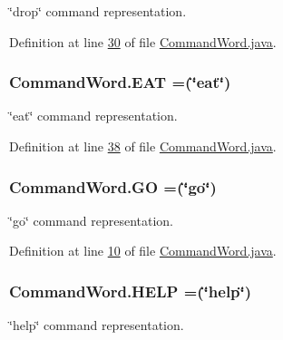 \char`\"{}drop\char`\"{} command representation. 



Definition at line \hyperlink{CommandWord_8java_source_l00030}{30} of file \hyperlink{CommandWord_8java_source}{Command\-Word.\-java}.

\hypertarget{enumCommandWord_a8a3ddfcc3d3f62697323325970089d95}{
\subsubsection[{E\-A\-T}]{\setlength{\rightskip}{0pt plus 5cm}Command\-Word.\-E\-A\-T =(\char`\"{}eat\char`\"{})}}\label{enumCommandWord_a8a3ddfcc3d3f62697323325970089d95}


\char`\"{}eat\char`\"{} command representation. 



Definition at line \hyperlink{CommandWord_8java_source_l00038}{38} of file \hyperlink{CommandWord_8java_source}{Command\-Word.\-java}.

\hypertarget{enumCommandWord_ab85d8b5fa5f3890548bff9a1ccfba218}{
\subsubsection[{G\-O}]{\setlength{\rightskip}{0pt plus 5cm}Command\-Word.\-G\-O =(\char`\"{}go\char`\"{})}}\label{enumCommandWord_ab85d8b5fa5f3890548bff9a1ccfba218}


\char`\"{}go\char`\"{} command representation. 



Definition at line \hyperlink{CommandWord_8java_source_l00010}{10} of file \hyperlink{CommandWord_8java_source}{Command\-Word.\-java}.

\hypertarget{enumCommandWord_a8689456b5990b4dfa2c69427a862784d}{
\subsubsection[{H\-E\-L\-P}]{\setlength{\rightskip}{0pt plus 5cm}Command\-Word.\-H\-E\-L\-P =(\char`\"{}help\char`\"{})}}\label{enumCommandWord_a8689456b5990b4dfa2c69427a862784d}


\char`\"{}help\char`\"{} command representation. 



